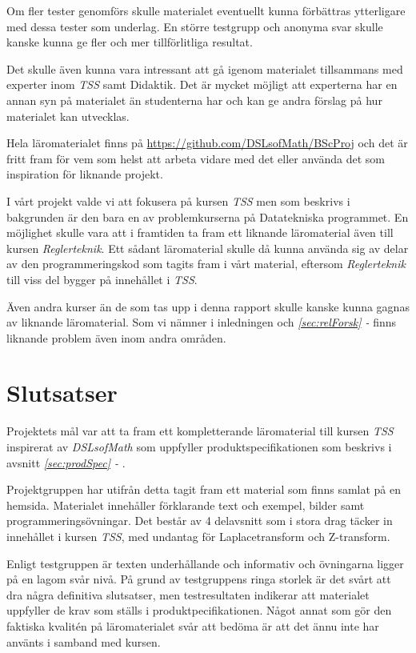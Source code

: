 \documentclass[12pt,a4paper,twoside,openright]{article}
\begin{document}
{Om fler tester genomförs skulle materialet eventuellt kunna förbättras
ytterligare med dessa tester som underlag. En större testgrupp och
anonyma svar skulle kanske kunna ge fler och mer tillförlitliga
resultat.

Det skulle även kunna vara intressant att gå igenom materialet
tillsammans med experter inom \textit{TSS} samt Didaktik. Det är
mycket möjligt att experterna har en annan syn på materialet än
studenterna har och kan ge andra förslag på hur materialet kan
utvecklas.

Hela läromaterialet finns på
\url{https://github.com/DSLsofMath/BScProj} och det är fritt fram för
vem som helst att arbeta vidare med det eller använda det som
inspiration för liknande projekt.

I vårt projekt valde vi att fokusera på kursen \textit{TSS} men som
beskrivs i bakgrunden är den bara en av problemkurserna på
Datatekniska programmet. En möjlighet skulle vara att i framtiden ta
fram ett liknande läromaterial även till kursen
\textit{Reglerteknik}. Ett sådant läromaterial skulle då kunna använda
sig av delar av den programmeringskod som tagits fram i vårt material,
eftersom \textit{Reglerteknik} till viss del bygger på innehållet i
\textit{TSS}.

Även andra kurser än de som tas upp i denna rapport skulle kanske
kunna gagnas av liknande läromaterial. Som vi nämner i inledningen och
\textit{\ref{sec:relForsk} - } finns liknande
problem även inom andra områden.


\section{Slutsatser}

Projektets mål var att ta fram ett kompletterande läromaterial till
kursen \textit{TSS} inspirerat av \textit{DSLsofMath} som uppfyller
produktspecifikationen som beskrivs i avsnitt
\textit{\ref{sec:prodSpec} - }.

Projektgruppen har utifrån detta tagit fram ett material som finns
samlat på en hemsida. Materialet innehåller förklarande text och
exempel, bilder samt programmeringsövningar. Det består av 4
delavsnitt som i stora drag täcker in innehållet i kursen
\textit{TSS}, med undantag för Laplacetransform och Z-transform.

Enligt testgruppen är texten underhållande och informativ och
övningarna ligger på en lagom svår nivå. På grund av testgruppens
ringa storlek är det svårt att dra några definitiva slutsatser, men
testresultaten indikerar att materialet uppfyller de krav som ställs i
produktpecifikationen. Något annat som gör den faktiska kvalitén på
läromaterialet svår att bedöma är att det ännu inte har använts i
samband med kursen.

}
\end{document}

